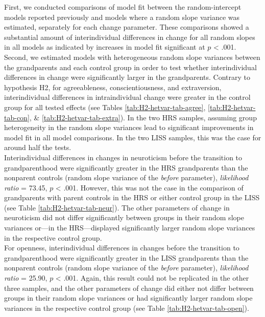 \documentclass[
  english,
  man, noextraspace]{apa7}
\begin{document}
First, we conducted comparisons of model fit between the random-intercept models reported previously and models where a random slope variance was estimated, separately for each change parameter. These comparisons showed a substantial amount of interindividual differences in change for all random slopes in all models as indicated by increases in model fit significant at \(p\) \textless{} .001.\\
Second, we estimated models with heterogeneous random slope variances between the grandparents and each control group in order to test whether interindividual differences in change were significantly larger in the grandparents. Contrary to hypothesis H2, for agreeableness, conscientiousness, and extraversion, interindividual differences in intraindividual change were greater in the control group for all tested effects (see Tables \ref{tab:H2-hetvar-tab-agree}, \ref{tab:H2-hetvar-tab-con}, \& \ref{tab:H2-hetvar-tab-extra}). In the two HRS samples, assuming group heterogeneity in the random slope variances lead to significant improvements in model fit in all model comparisons. In the two LISS samples, this was the case for around half the tests.\\
Interindividual differences in changes in neuroticism before the transition to grandparenthood were significantly greater in the HRS grandparents than the nonparent controls (random slope variance of the \emph{before} parameter), \emph{likelihood ratio} = 73.45, \(p\) \textless{} .001. However, this was not the case in the comparison of grandparents with parent controls in the HRS or either control group in the LISS (see Table \ref{tab:H2-hetvar-tab-neur}). The other parameters of change in neuroticism did not differ significantly between groups in their random slope variances or---in the HRS---displayed significantly larger random slope variances in the respective control group.\\
For openness, interindividual differences in changes before the transition to grandparenthood were significantly greater in the LISS grandparents than the nonparent controls (random slope variance of the \emph{before} parameter), \emph{likelihood ratio} = 25.90, \(p\) \textless{} .001. Again, this result could not be replicated in the other three samples, and the other parameters of change did either not differ between groups in their random slope variances or had significantly larger random slope variances in the respective control group (see Table \ref{tab:H2-hetvar-tab-open}).\\
\end{document}
